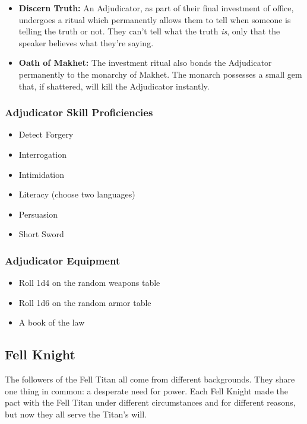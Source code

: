 \begin{multicols}{2}
\begin{itemize}
  \item \textbf{Discern Truth:} An Adjudicator, as part of their final
    investment of office, undergoes a ritual which permanently allows them
    to tell when someone is telling the truth or not. They can't tell
    what the truth \textit{is}, only that the speaker believes what
    they're saying.
  \item \textbf{Oath of Makhet:} The investment ritual also bonds the
    Adjudicator permanently to the monarchy of Makhet. The monarch
    possesses a small gem that, if shattered, will kill the Adjudicator
    instantly.
\end{itemize}

\subsubsection{Adjudicator Skill Proficiencies}

\begin{itemize}
  \item Detect Forgery
  \item Interrogation
  \item Intimidation
  \item Literacy (choose two languages)
  \item Persuasion
  \item Short Sword
\end{itemize}

\subsubsection{Adjudicator Equipment}

\begin{itemize}
  \item Roll 1d4 on the random weapons table
  \item Roll 1d6 on the random armor table
  \item A book of the law
\end{itemize}

\subsection{Fell Knight}

The followers of the Fell Titan all come from different backgrounds.
They share one thing in common: a desperate need for power. Each Fell
Knight made the pact with the Fell Titan under different circumstances
and for different reasons, but now they all serve the Titan's will.


\end{multicols}
